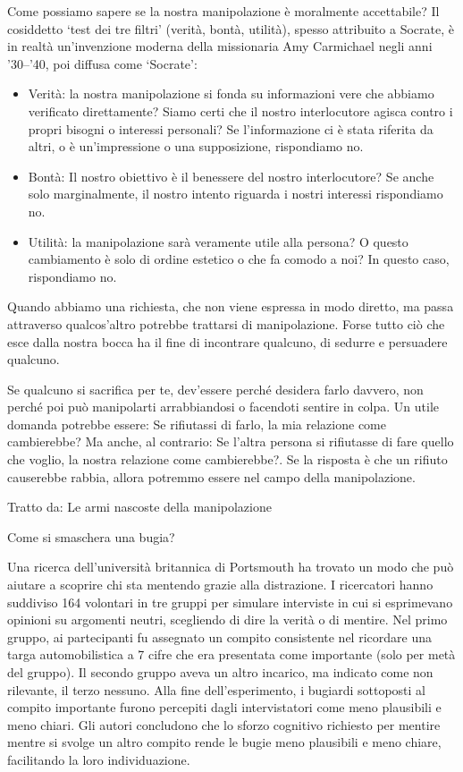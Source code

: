 \documentclass[12pt]{book} %
\begin{document}
Come possiamo sapere se la nostra manipolazione è moralmente accettabile? Il cosiddetto ‘test dei tre filtri’ (verità, bontà, utilità), spesso attribuito a Socrate, è in realtà un’invenzione moderna della missionaria Amy Carmichael negli anni ’30–’40, poi diffusa come ‘Socrate’: 

\begin{itemize}
\item Verità: la nostra manipolazione si fonda su informazioni vere che abbiamo verificato direttamente? Siamo certi che
il nostro interlocutore agisca contro i propri bisogni o interessi personali? Se l'informazione ci
è stata riferita da altri, o è un'impressione o una supposizione, rispondiamo no. 
\item Bontà: Il nostro obiettivo è il benessere del nostro interlocutore? Se anche solo marginalmente, il nostro intento
riguarda i nostri interessi rispondiamo no. 
\item Utilità: la manipolazione sarà veramente utile alla persona? O questo cambiamento è solo di ordine estetico o che
fa comodo a noi? In questo caso, rispondiamo no. 
\end{itemize}

Quando abbiamo una richiesta, che non viene espressa in modo diretto, ma passa attraverso qualcos'altro potrebbe trattarsi di manipolazione. Forse tutto ciò che esce dalla nostra bocca ha il fine di
incontrare qualcuno, di sedurre e persuadere qualcuno.

Se qualcuno si sacrifica per te, dev'essere perché desidera farlo davvero, non perché poi può
manipolarti arrabbiandosi o facendoti sentire in colpa. Un utile domanda potrebbe essere: Se rifiutassi di farlo, la
mia relazione come cambierebbe? Ma anche, al contrario: Se l'altra persona si rifiutasse di fare
quello che voglio, la nostra relazione come cambierebbe?. Se la risposta è che un rifiuto causerebbe rabbia, allora
potremmo essere nel campo della manipolazione.

Tratto da: Le armi nascoste della manipolazione

\begin{mdframed}[linewidth=1pt]
Come si smaschera una bugia?

Una ricerca dell'università britannica di Portsmouth ha trovato un modo che può aiutare a scoprire chi sta mentendo grazie alla distrazione. 
I ricercatori hanno suddiviso 164 volontari in tre gruppi per simulare interviste in cui si
esprimevano opinioni su argomenti neutri, scegliendo di dire la verità o di mentire. Nel primo gruppo, ai partecipanti fu assegnato un compito consistente nel ricordare una targa automobilistica a 7 cifre che era presentata come importante (solo per metà del gruppo). Il secondo gruppo aveva
un altro incarico, ma indicato come non rilevante, il terzo nessuno. Alla fine dell’esperimento, i bugiardi sottoposti al compito importante furono percepiti dagli intervistatori come meno plausibili e meno chiari. Gli autori concludono che lo sforzo cognitivo richiesto per mentire mentre si svolge un altro compito rende le bugie meno plausibili e meno chiare, facilitando la loro individuazione.
\end{mdframed}
\end{document}
